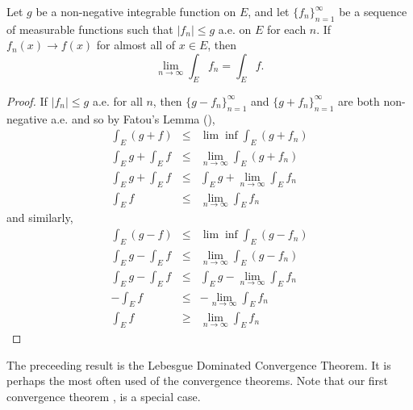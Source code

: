 \begin{pblm}\label{p:lebesguedominatedconvergence}%
	Let $g$ be a non-negative integrable function on $E$, and let $\{f_n\}_{n=1}^\infty$ 
	be a sequence of measurable functions such that $|f_n| \le g$ a.e. on $E$ for each 
	$n$. If $f_n(x) \rightarrow f(x)$ for almost all of $x \in E$, then 
	\begin{equation*}
		\lim\limits_{n\to\infty}\int_Ef_n = \int_Ef. 
	\end{equation*}
\begin{proof}
	If $|f_n| \le g$ a.e. for all $n$, then 
	$\{g - f_n\}_{n=1}^\infty$ and $\{g + f_n\}_{n=1}^\infty$ are both non-negative a.e. 
	and so by Fatou's Lemma (), 
	\begin{equation*}
	\begin{array}{rcl}
		\int_E(g+f) & \le & \lim\inf\int_E(g+f_n) \\ 
		\int_Eg + \int_E f & \le & \lim\limits_{n\to\infty}\int_E(g+f_n)\\
		\int_Eg + \int_Ef & \le & \int_Eg + \lim\limits_{n\to\infty}\int_Ef_n\\
		\int_Ef & \le & \lim\limits_{n\to\infty}\int_Ef_n
	\end{array}
	\end{equation*}
	and similarly, 
	\begin{equation*}
	\begin{array}{rcl}
		\int_E(g-f) & \le & \lim\inf\int_E(g-f_n) \\ 
		\int_Eg - \int_E f & \le & \lim\limits_{n\to\infty}\int_E(g-f_n)\\
		\int_Eg - \int_Ef & \le & \int_Eg - \lim\limits_{n\to\infty}\int_Ef_n\\
		-\int_Ef & \le & -\lim\limits_{n\to\infty}\int_Ef_n\\
		\int_Ef & \ge & \lim\limits_{n\to\infty}\int_Ef_n
	\end{array}
	\end{equation*}
\end{proof}
\end{pblm}

\begin{rmk}%
	The preceeding result is the Lebesgue Dominated Convergence Theorem. It is perhaps the 
	most often used of the convergence theorems. Note that our first convergence theorem 
	, is a special case. 
\end{rmk}

